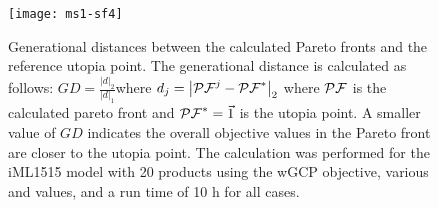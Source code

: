 \begin{figure}[h]
  \centering
  \texttt{[image: ms1-sf4]}
    \caption[Generational distance among different design parameters]{Generational distances between the calculated Pareto fronts and the reference utopia point. The generational distance is calculated as follows: $GD=\frac{\left|d\right|_2}{\left|d\right|_1}$where  $d_j=\left| \mathcal{PF}^j - \mathcal{PF}^* \right|_2$ where $\mathcal{PF}$ is the calculated pareto front and $\mathcal{PF}^*=\vec{1}$ is the utopia point. A smaller value of $\mathit{GD}$ indicates the overall objective values in the Pareto front are closer to the utopia point. The calculation was performed for the iML1515 model with 20 products using the wGCP objective, various  and  values, and a run time of 10 h for all cases.
    }
\end{figure}
